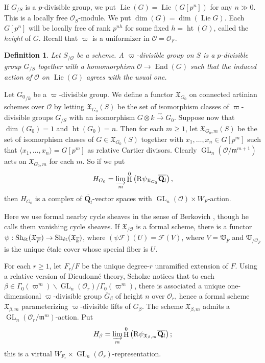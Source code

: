 \documentclass{article}
\DeclareMathOperator{\End}{End}
\DeclareMathOperator{\GL}{GL}
\DeclareMathOperator{\h}{H}
\DeclareMathOperator{\height}{ht}
\DeclareMathOperator{\lie}{Lie}
\DeclareMathOperator{\sheaves}{Sh}
\newcommand{\etale}{\textnormal{\'et}}
\newcommand{\iso}{\xrightarrow\sim}
\newcommand{\cO}{\mathcal{O}}
\newcommand{\dQ}{\mathbf{Q}}
\newcommand{\eR}{\mathrm{R}}
\newcommand{\fm}{\mathfrak{m}}
\newcommand{\fV}{\mathfrak{V}}
\newcommand{\fX}{\mathfrak{X}}
\newcommand{\sF}{\mathscr{F}}
\newcommand{\sO}{\mathscr{O}}
\newtheorem{definition}[subsection]{Definition}
\begin{document}
If $G_{/S}$ is a $p$-divisible group, we put $\lie(G)=\lie(G[p^n])$ for any 
$n\gg 0$. This is a locally free $\sO_S$-module. We put 
$\dim(G)=\dim(\lie G)$. Each $G[p^n]$ will be locally free of rank 
$p^{n h}$ for some fixed $h=\height(G)$, called the \emph{height} of $G$. 
Recall that $\varpi$ is a uniformizer in $\cO=\cO_F$. 

\begin{definition}
Let $S_{/\cO}$ be a scheme. A \emph{$\varpi$-divisible group} on $S$ is a 
$p$-divisible group $G_{/S}$ together with a homomorphism 
$\cO\to \End(G)$ such that the induced action of $\cO$ on $\lie(G)$ agrees 
with the usual one. 
\end{definition}

Let ${G_0}_{/k}$ be a $\varpi$-divisible group. We define a functor 
$\fX_{G_0}$ on connected artinian schemes over $\cO$ by letting 
$\fX_{G_0}(S)$ be the set of isomorphism classes of $\varpi$-divisible 
groups $G_{/S}$ with an isomorphism $G\otimes k\iso G_0$. Suppose now that 
$\dim(G_0)=1$ and $\height(G_0)=n$. Then for each 
$m\geqslant 1$, let $\fX_{G_0,m}(S)$ be the set of isomorphism classes of 
$G\in \fX_{G_0}(S)$ together with $x_1,\dots,x_n\in G[p^m]$ such that 
$\langle x_1,\dots,x_n\rangle = G[p^m]$ as relative Cartier divisors. 
Clearly $\GL_n(\cO/\fm^{m+1})$ acts on $\fX_{G_0,m}$ for each $m$. So if 
we put 
\[
  H_{G_0} = \varinjlim_m \h^0\left(\eR \psi_{\fX_{G_0}}\overline{\dQ_l}\right) ,
\]
then $H_{G_0}$ is a complex of $\overline{\dQ_l}$-vector spaces with 
$\GL_n(\cO)\times W_F$-action. 

Here we use formal nearby cycle sheaves in the sense of Berkovich 
\cite{berkovich-1996}, though he calls them vanishing cycle sheaves. If 
$\fX_{/\cO}$ is a formal scheme, there is a functor 
$\psi:\sheaves_\etale(\fX_{\overline F}) \to \sheaves_\etale(\fX_{\overline k})$, 
where $(\psi \sF)(U)=\sF(V)$, where $V=\fV_{\overline F}$ and 
$\fV_{/\cO_{\overline F}}$ is the unique \'etale cover whose special fiber is 
$U$. 

For each $r\geqslant 1$, let $F_r/F$ be the unique degree-$r$ unramified 
extension of $F$. Using a relative version of Dieudonn\'e theory, Scholze 
notices that to each 
$\beta\in \Gamma_0(\varpi^m)\backslash \GL_n(\cO_r)/\Gamma_0(\varpi^m)$, 
there is associated a unique one-dimensional $\varpi$-divisible group 
$\overline G_\beta$ of height $n$ over $\cO_r$, 
hence a formal scheme $\fX_{\beta,m}$ parameterizing $\varpi$-divisible 
lifts of $\overline G_\beta$. The scheme $\fX_{\beta,m}$ admits a 
$\GL_n(\cO_r/\fm^m)$-action. Put 
\[
  H_\beta = \varinjlim_m \h^0\left(\eR \psi_{\fX_{\beta,m}} \overline{\dQ_l}\right) ;
\]
this is a virtual $ W_{F_r}\times\GL_n(\cO_r)$-representation. 
\end{document}
